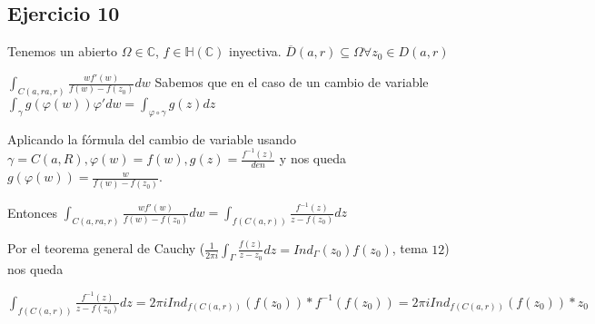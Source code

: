 \subsection{Ejercicio 10}
Tenemos un abierto $\Omega\in\mathbb{C}$, $f\in\mathbb{H}(\mathbb{C})$ inyectiva.
$\overline{D}(a,r) \subseteq \Omega \forall z_0\in D(a,r)$

$\int_{C(a,ra,r)} \frac{wf'(w)}{f(w)-f(z_0)} dw$
Sabemos que en el caso de un cambio de variable
$\int_{\gamma}g(\varphi(w))\varphi' dw =\int_{\varphi \circ \gamma} g(z)dz $

Aplicando la fórmula del cambio de variable usando
$\gamma = C(a,R), \varphi(w) = f(w), g(z) = \frac{f^{-1}(z)}{den}$
y nos queda
$g(\varphi(w)) = \frac{w}{f(w)-f(z_0)}$.

Entonces
$\int_{C(a,ra,r)} \frac{wf'(w)}{f(w)-f(z_0)} dw = \int_{f(C(a,r))} \frac{f^{-1}(z)}{z-f(z_0)} dz$

Por el teorema general de Cauchy ($\frac{1}{2\pi i} \int_{\Gamma}\frac{f(z)}{z-z_0} dz = Ind_{\Gamma} (z_0)f(z_0)$, tema $12$) nos queda

$\int_{f(C(a,r))} \frac{f^{-1}(z)}{z-f(z_0)} dz = 2\pi i Ind_{f(C(a,r))} (f(z_0)) * f^{-1}(f(z_0)) = 2\pi i Ind_{f(C(a,r))} (f(z_0)) * z_0$ 